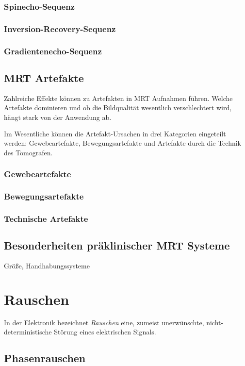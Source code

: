 \subsubsection{Spinecho-Sequenz}
\subsubsection{Inversion-Recovery-Sequenz}
\subsubsection{Gradientenecho-Sequenz}


\subsection{MRT Artefakte}
Zahlreiche Effekte können zu Artefakten in MRT Aufnahmen führen. Welche Artefakte dominieren und ob die Bildqualität wesentlich verschlechtert wird, hängt stark von der Anwendung ab.

Im Wesentliche können die Artefakt-Ursachen in drei Kategorien eingeteilt werden: Gewebeartefakte, Bewegungsartefakte und Artefakte durch die Technik des Tomografen.

\subsubsection{Gewebeartefakte}

\subsubsection{Bewegungsartefakte}

\subsubsection{Technische Artefakte}

\subsection{Besonderheiten präklinischer MRT Systeme}
Größe, Handhabungssysteme




\section{Rauschen}
In der Elektronik bezeichnet \textit{Rauschen} eine, zumeist unerwünschte, nicht-\-deterministische Störung eines elektrischen Signals.


\subsection{Phasenrauschen}